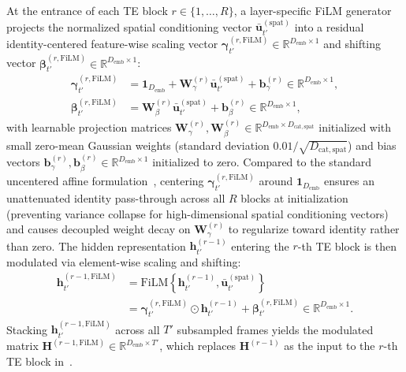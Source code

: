 \documentclass[lettersize,journal]{IEEEtran}
\begin{document}
At the entrance of each \gls{TE} block $r \in \{1, \dots, R\}$, a layer-specific \gls{FiLM} generator projects the normalized spatial conditioning vector $\bar{\mathbf{u}}_{t'}^{(\mathrm{spat})}$ into a residual identity-centered feature-wise scaling vector $\bm{\gamma}_{t'}^{(r,\mathrm{FiLM})} \in \mathbb{R}^{D_{\mathrm{emb}} \times 1}$ and shifting vector $\bm{\beta}_{t'}^{(r,\mathrm{FiLM})} \in \mathbb{R}^{D_{\mathrm{emb}} \times 1}$:
\begin{align}
  \bm{\gamma}_{t'}^{(r,\mathrm{FiLM})} &= \mathbf{1}_{D_{\mathrm{emb}}} + \mathbf{W}_{\gamma}^{(r)} \bar{\mathbf{u}}_{t'}^{(\mathrm{spat})} + \mathbf{b}_{\gamma}^{(r)} \in \mathbb{R}^{D_{\mathrm{emb}} \times 1}, \label{eq:film_gamma} \\
  \bm{\beta}_{t'}^{(r,\mathrm{FiLM})} &= \mathbf{W}_{\beta}^{(r)} \bar{\mathbf{u}}_{t'}^{(\mathrm{spat})} + \mathbf{b}_{\beta}^{(r)} \in \mathbb{R}^{D_{\mathrm{emb}} \times 1}, \label{eq:film_beta}
\end{align}
with learnable projection matrices $\mathbf{W}_{\gamma}^{(r)}, \mathbf{W}_{\beta}^{(r)} \in \mathbb{R}^{D_{\mathrm{emb}} \times D_{\mathrm{cat,spat}}}$ initialized with small zero-mean Gaussian weights (standard deviation $0.01 / \sqrt{D_{\mathrm{cat,spat}}}$) and bias vectors $\mathbf{b}_{\gamma}^{(r)}, \mathbf{b}_{\beta}^{(r)} \in \mathbb{R}^{D_{\mathrm{emb}} \times 1}$ initialized to zero. Compared to the standard uncentered affine formulation~\cite{perez2018film,cornell2022overlapped}, centering $\bm{\gamma}_{t'}^{(r,\mathrm{FiLM})}$ around $\mathbf{1}_{D_{\mathrm{emb}}}$ ensures an unattenuated identity pass-through across all $R$ blocks at initialization (preventing variance collapse for high-dimensional spatial conditioning vectors) and causes decoupled weight decay on $\mathbf{W}_{\gamma}^{(r)}$ to regularize toward identity rather than zero. The hidden representation $\mathbf{h}_{t'}^{(r-1)}$ entering the $r$-th \gls{TE} block is then modulated via element-wise scaling and shifting:
\begin{align}
  \mathbf{h}_{t'}^{(r-1,\mathrm{FiLM})} &= \mathrm{FiLM}\!\left\{\mathbf{h}_{t'}^{(r-1)}, \bar{\mathbf{u}}_{t'}^{(\mathrm{spat})}\right\} \nonumber \\
  &= \bm{\gamma}_{t'}^{(r,\mathrm{FiLM})} \odot \mathbf{h}_{t'}^{(r-1)} + \bm{\beta}_{t'}^{(r,\mathrm{FiLM})} \in \mathbb{R}^{D_{\mathrm{emb}} \times 1}.
  \label{eq:film_modulation}
\end{align}
Stacking $\mathbf{h}_{t'}^{(r-1,\mathrm{FiLM})}$ across all $T'$ subsampled frames yields the modulated matrix $\mathbf{H}^{(r-1,\mathrm{FiLM})} \in \mathbb{R}^{D_{\mathrm{emb}} \times T'}$, which replaces $\mathbf{H}^{(r-1)}$ as the input to the $r$-th \gls{TE} block in~.
\end{document}
